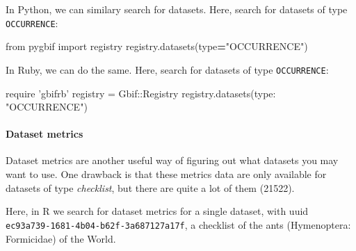 \documentclass[author-year, review, 11pt]{components/elsarticle} %
\newenvironment{Shaded}{\begin{snugshade}}{\end{snugshade}}
\newcommand{\KeywordTok}[1]{\textcolor[rgb]{0.13,0.29,0.53}{\textbf{#1}}}
\newcommand{\DataTypeTok}[1]{\textcolor[rgb]{0.13,0.29,0.53}{#1}}
\newcommand{\StringTok}[1]{\textcolor[rgb]{0.31,0.60,0.02}{#1}}
\newcommand{\ImportTok}[1]{#1}
\newcommand{\OperatorTok}[1]{\textcolor[rgb]{0.81,0.36,0.00}{\textbf{#1}}}
\newcommand{\BuiltInTok}[1]{#1}
\newcommand{\NormalTok}[1]{#1}
\begin{document}
In Python, we can similary search for datasets. Here, search for
datasets of type \texttt{OCCURRENCE}:

\begin{Shaded}
\begin{Highlighting}[]
\ImportTok{from}\NormalTok{ pygbif }\ImportTok{import}\NormalTok{ registry}
\NormalTok{registry.datasets(}\BuiltInTok{type}\OperatorTok{=}\StringTok{"OCCURRENCE"}\NormalTok{)}
\end{Highlighting}
\end{Shaded}

In Ruby, we can do the same. Here, search for datasets of type
\texttt{OCCURRENCE}:

\begin{Shaded}
\begin{Highlighting}[]
\NormalTok{require }\StringTok{'gbifrb'}
\NormalTok{registry = }\DataTypeTok{Gbif}\NormalTok{::}\DataTypeTok{Registry}
\NormalTok{registry.datasets(}\StringTok{type: "OCCURRENCE"}\NormalTok{)}
\end{Highlighting}
\end{Shaded}

\paragraph{Dataset metrics}\label{dataset-metrics}

Dataset metrics are another useful way of figuring out what datasets you
may want to use. One drawback is that these metrics data are only
available for datasets of type \emph{checklist}, but there are quite a
lot of them (21522).

Here, in R we search for dataset metrics for a single dataset, with uuid
\texttt{ec93a739-1681-4b04-b62f-3a687127a17f}, a checklist of the ants
(Hymenoptera: Formicidae) of the World.

\begin{Shaded}
\end{Shaded}
\end{document}
